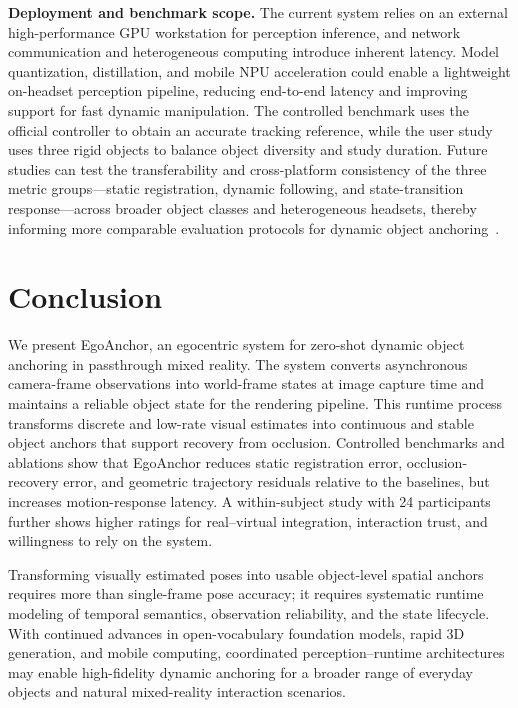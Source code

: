 \documentclass[review]{vgtc}
\begin{document}
\textbf{Deployment and benchmark scope.}
The current system relies on an external high-performance GPU workstation for perception inference, and network communication and heterogeneous computing introduce inherent latency. Model quantization, distillation, and mobile NPU acceleration could enable a lightweight on-headset perception pipeline, reducing end-to-end latency and improving support for fast dynamic manipulation. The controlled benchmark uses the official controller to obtain an accurate tracking reference, while the user study uses three rigid objects to balance object diversity and study duration. Future studies can test the transferability and cross-platform consistency of the three metric groups---static registration, dynamic following, and state-transition response---across broader object classes and heterogeneous headsets, thereby informing more comparable evaluation protocols for dynamic object anchoring~\cite{cheng2024tracking,hu2024applemeta,hu2025xrrealitycheck}.

\section{Conclusion}\label{sec:conclusion}

We present EgoAnchor, an egocentric system for zero-shot dynamic object anchoring in passthrough mixed reality. The system converts asynchronous camera-frame observations into world-frame states at image capture time and maintains a reliable object state for the rendering pipeline. This runtime process transforms discrete and low-rate visual estimates into continuous and stable object anchors that support recovery from occlusion. Controlled benchmarks and ablations show that EgoAnchor reduces static registration error, occlusion-recovery error, and geometric trajectory residuals relative to the baselines, but increases motion-response latency. A within-subject study with 24 participants further shows higher ratings for real--virtual integration, interaction trust, and willingness to rely on the system.

Transforming visually estimated poses into usable object-level spatial anchors requires more than single-frame pose accuracy; it requires systematic runtime modeling of temporal semantics, observation reliability, and the state lifecycle. With continued advances in open-vocabulary foundation models, rapid 3D generation, and mobile computing, coordinated perception--runtime architectures may enable high-fidelity dynamic anchoring for a broader range of everyday objects and natural mixed-reality interaction scenarios.




\end{document}

